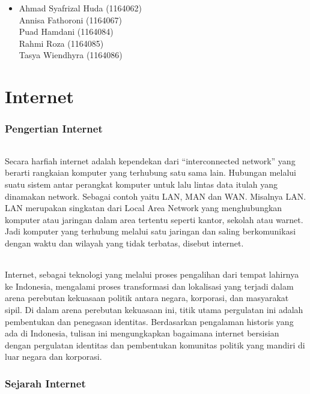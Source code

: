 \documentclass[12pt, a4paper]{article}
\begin{document}
\begin{itemize}
        \item
        Ahmad Syafrizal Huda (1164062) \\
        Annisa Fathoroni (1164067) \\
        Puad Hamdani (1164084) \\
        Rahmi Roza (1164085) \\
        Tasya Wiendhyra (1164086) \\
\end{itemize}

\part{Internet}
\section{Pengertian Internet}
\paragraph{} Secara harfiah internet adalah kependekan dari “interconnected network” yang berarti rangkaian komputer yang terhubung satu sama lain. Hubungan melalui suatu sistem antar perangkat komputer untuk lalu lintas data itulah yang dinamakan network. Sebagai contoh yaitu LAN, MAN dan WAN. Misalnya LAN. LAN merupakan singkatan dari Local Area Network yang menghubungkan komputer atau jaringan dalam area tertentu seperti kantor, sekolah atau warnet. Jadi komputer yang terhubung melalui satu jaringan dan saling berkomunikasi dengan waktu dan wilayah yang tidak terbatas, disebut internet.
\paragraph{} Internet, sebagai teknologi yang melalui proses pengalihan dari tempat lahirnya ke Indonesia, mengalami proses transformasi dan lokalisasi yang terjadi dalam arena perebutan kekuasaan politik antara negara, korporasi, dan masyarakat sipil. Di dalam arena perebutan kekuasaan ini, titik utama pergulatan ini adalah pembentukan dan penegasan identitas. Berdasarkan pengalaman historis yang ada di Indonesia, tulisan ini mengungkapkan bagaimana internet bersisian dengan pergulatan identitas dan pembentukan komunitas politik yang mandiri di luar negara dan korporasi.

\section{Sejarah Internet}
\end{document}
